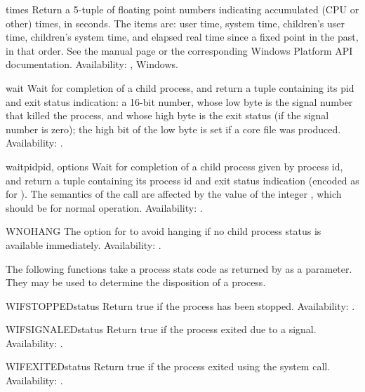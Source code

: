 \begin{funcdesc}{times}{}
Return a 5-tuple of floating point numbers indicating accumulated (CPU
or other)
times, in seconds.  The items are: user time, system time, children's
user time, children's system time, and elapsed real time since a fixed
point in the past, in that order.  See the \UNIX{} manual page
 or the corresponding Windows Platform API
documentation.
Availability: \UNIX{}, Windows.
\end{funcdesc}

\begin{funcdesc}{wait}{}
Wait for completion of a child process, and return a tuple containing
its pid and exit status indication: a 16-bit number, whose low byte is
the signal number that killed the process, and whose high byte is the
exit status (if the signal number is zero); the high bit of the low
byte is set if a core file was produced.
Availability: \UNIX{}.
\end{funcdesc}

\begin{funcdesc}{waitpid}{pid, options}
Wait for completion of a child process given by process id, and return
a tuple containing its process id and exit status indication (encoded
as for ).  The semantics of the call are affected by
the value of the integer , which should be  for
normal operation.
Availability: \UNIX{}.
\end{funcdesc}

\begin{datadesc}{WNOHANG}
The option for  to avoid hanging if no child
process status is available immediately.
Availability: \UNIX{}.
\end{datadesc}

The following functions take a process stats code as returned by
 as a parameter.  They may be used to determine
the disposition of a process.

\begin{funcdesc}{WIFSTOPPED}{status}
Return true if the process has been stopped.
Availability: \UNIX{}.
\end{funcdesc}

\begin{funcdesc}{WIFSIGNALED}{status}
Return true if the process exited due to a signal.
Availability: \UNIX{}.
\end{funcdesc}

\begin{funcdesc}{WIFEXITED}{status}
Return true if the process exited using the  system
call.
Availability: \UNIX{}.
\end{funcdesc}

